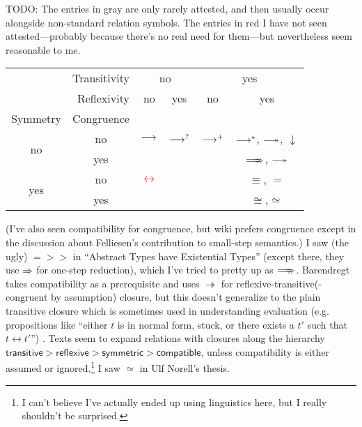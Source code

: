 \documentclass[11pt]{article} %
\theoremstyle{definition}
\theoremstyle{remark}
\begin{document}
TODO:
The entries in gray are only rarely attested, and then usually occur alongside non-standard relation symbols.
The entries in red I have not seen attested---probably because there's no real need for them---but nevertheless seem reasonable to me.
\begin{center}
\begin{tabular}{cc|cccc}
\multicolumn{2}{r|}{Transitivity}     & \multicolumn{2}{c}{no} & \multicolumn{2}{c}{yes} \\
\multicolumn{2}{r|}{Reflexivity} & no & yes & no & yes \\
Symmetry & Congruence \\
\hline
\multirow{2}{*}{no} & no  & $\longrightarrow$ & \textcolor{red}{$\longrightarrow^?$} & $\longrightarrow^+$ & $\longrightarrow^*$, \textcolor{gray}{$\relbar\joinrel\twoheadrightarrow$}, $\downarrow$ \\
 & yes                    &  &  &  & \textcolor{gray}{$=\joinrel\mathrel{\mathrlap\To\To}$}, \textcolor{gray}{$\relbar\joinrel\twoheadrightarrow$} \\
\multirow{2}{*}{yes} & no & \textcolor{red}{$\longleftrightarrow$} &  &  & $\equiv$, \textcolor{gray}{$=$} \\
 & yes                    &  &  &  & $\cong$,$\simeq$ \\
\end{tabular}
\end{center}
(I've also seen compatibility for congruence, but wiki prefers congruence except in the discussion about Felliesen's contribution to small-step semantics.)
I saw (the ugly) $=\!>\!>$ in ``Abstract Types have Existential Types'' (except there, they use $\Rightarrow$ for one-step reduction), which I've tried to pretty up as $=\joinrel\mathrel{\mathrlap\To\To}$.
Barendregt takes compatibility as a prerequisite and uses $\twoheadrightarrow$ for reflexive-transitive(-congruent by assumption) closure, but this doesn't generalize to the plain transitive closure which is sometimes used in understanding evaluation (e.g. propositions like ``either $t$ is in normal form, stuck, or there exists a $t'$ such that $t \longleftrightarrow t'$'') .
Texts seem to expand relations with closures along the hierarchy $\mathsf{transitive > reflexive > symmetric > compatible}$, unless compatibility is either assumed or ignored.\footnote{I can't believe I've actually ended up using linguistics here, but I really shouldn't be surprised.}
I saw $\simeq$ in Ulf Norell's thesis.
\end{document}
